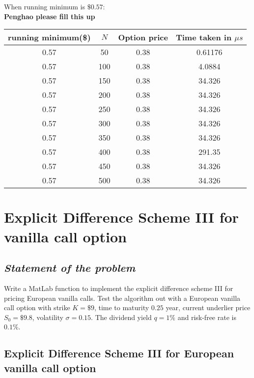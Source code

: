 \hspace{23mm} When running minimum is $\$0.57$: \\
\textbf{Penghao please fill this up}
\begin{center}
	\begin{tabular}{| c | c | c | c |}
		\hline running minimum(\$) & $N$ & Option price & Time taken in $\mu s$\\
		[0.5ex]
		\hline 0.57 & 50 & 0.38 & 0.61176 \\
		\hline 0.57 & 100 & 0.38 & 4.0884 \\
		\hline 0.57 & 150 & 0.38 & 34.326 \\
		\hline 0.57 & 200 & 0.38 & 34.326 \\
		\hline 0.57 & 250 & 0.38 & 34.326 \\
		\hline 0.57 & 300 & 0.38 & 34.326 \\
		\hline 0.57 & 350 & 0.38 & 34.326 \\
		\hline 0.57 & 400 & 0.38 & 291.35 \\
		\hline 0.57 & 450 & 0.38 & 34.326 \\
		\hline 0.57 & 500 & 0.38 & 34.326 \\
		\hline
	\end{tabular}
\end{center}

\section{Explicit Difference Scheme III for vanilla call option}
\subsection*{\emph{Statement of the problem}}
Write a MatLab function to implement the explicit difference scheme III for pricing European vanilla calls. Test the algorithm out with a European vanilla call option with strike $K = \$9$, time to maturity $0.25$ year, current underlier price $S_0 = \$9.8$, volatility $\sigma=0.15$. The dividend yield $q = 1\%$ and risk-free rate is $0.1\%$.

\subsection{Explicit Difference Scheme III for European vanilla call option}

